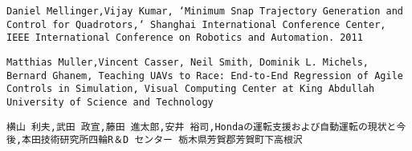 \begin{thebibliography}{99}
\texttt{Daniel Mellinger,Vijay Kumar, `Minimum Snap Trajectory Generation and Control for Quadrotors,` Shanghai International Conference Center, IEEE International Conference on Robotics and Automation. 2011}

\texttt{Matthias Muller,Vincent Casser, Neil Smith, Dominik L. Michels, Bernard Ghanem, Teaching UAVs to Race: End-to-End Regression of Agile Controls in Simulation, Visual Computing Center at King Abdullah University of Science and Technology}

\texttt{横山 利夫,武田 政宣,藤田 進太郎,安井 裕司,Hondaの運転支援および自動運転の現状と今後,本田技術研究所四輪R＆D センター 栃木県芳賀郡芳賀町下高根沢}

\end{thebibliography}

